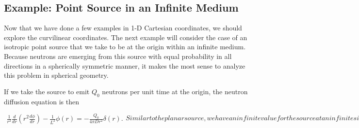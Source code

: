 \subsection{Example: Point Source in an Infinite Medium}

Now that we have done a few examples in 1-D Cartesian coordinates, we should explore the curvilinear coordinates. The next example will consider the case of an isotropic point source that we take to be at the origin within an infinite medium. Because neutrons are emerging from this source with equal probability in all directions in a spherically symmetric manner, it makes the most sense to analyze this problem in spherical geometry.

If we take the source to emit $Q_0$ neutrons per unit time at the origin, the neutron diffusion equation is then
\begin{subequations}
\begin{align}
  \frac{1}{r^2} \frac{d}{dr} \left( r^2 \frac{d\phi}{dr} \right) - \frac{1}{L^2} \phi(r) = -\frac{Q_0}{4\pi D r^2} \delta(r).
\end{align}
Similar to the planar source, we have an infinite value for the source at an infinitesimal location. In this case it is at a single point as opposed to distributed over an infinite planar surface. The boundary condition here states that the net flow of across a vanishingly small spherical surface centered about the origin is equal to the source rate. Additionally, since the domain extends to infinity, we need to ensure the scalar flux stays finite as the radial coordinate goes to infinity---there is no such restriction at the origin because there is a point source that theoretically has infinite density (but finite intensity). The boundary conditions are then,
\begin{align}
  &\lim_{r \rightarrow 0} 4\pi r^2 J(r) = Q_0, \\
  &\lim_{r \rightarrow \infty} \phi(r) < \infty.
\end{align}
\end{subequations}


